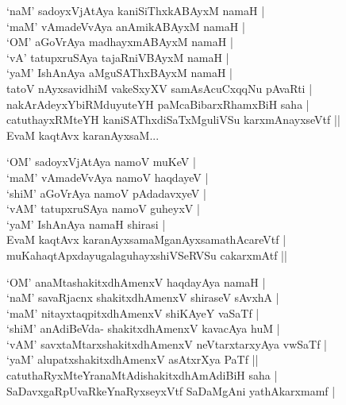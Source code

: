 \begin{entry}
\medskip
\begin{shl}
`naM' sadoyxVjAtAya kaniSiThxkABAyxM namaH |\\
`maM' vAmadeVvAya anAmikABAyxM namaH |\\
`OM' aGoVrAya madhayxmABAyxM namaH |\\
`vA' tatupxruSAya tajaRniVBAyxM namaH |\\
`yaM' IshAnAya aMguSAThxBAyxM namaH |\\
tatoV nAyxsavidhiM vakeSxyXV samAsAcuCxqqNu pAvaRti |\\
nakArAdeyxYbiRMduyuteYH paMcaBibarxRhamxBiH saha |\\
catuthayxRMteYH kaniSAThxdiSaTxMguliVSu karxmAnayxseVtf ||\\
EvaM kaqtAvx karanAyxsaM...
\end{shl}
\medskip
{}
\medskip
{}
\medskip
\begin{shl}
`OM' sadoyxVjAtAya namoV muKeV |\\
`maM' vAmadeVvAya namoV haqdayeV |\\
`shiM' aGoVrAya namoV pAdadavxyeV |\\
`vAM' tatupxruSAya namoV guheyxV |\\
`yaM' IshAnAya namaH shirasi |\\
EvaM kaqtAvx karanAyxsamaMganAyxsamathAcareVtf |\\
muKahaqtApxdayugalaguhayxshiVSeRVSu cakarxmAtf ||
\end{shl}
\medskip
{}
\medskip
{}
\medskip
\begin{shl}
`OM' anaMtashakitxdhAmenxV haqdayAya namaH |\\
`naM' savaRjacnx shakitxdhAmenxV shiraseV sAvxhA |\\
`maM' nitayxtaqpitxdhAmenxV shiKAyeY vaSaTf |\\
`shiM' anAdiBeVda- shakitxdhAmenxV kavacAya huM |\\
`vAM' savxtaMtarxshakitxdhAmenxV neVtarxtarxyAya vwSaTf |\\
`yaM' alupatxshakitxdhAmenxV asAtxrXya PaTf ||\\
catuthaRyxMteYranaMtAdishakitxdhAmAdiBiH saha |\\
SaDavxgaRpUvaRkeYnaRyxseyxVtf SaDaMgAni yathAkarxmamf |
\end{shl}
\medskip
{}
\end{entry}

